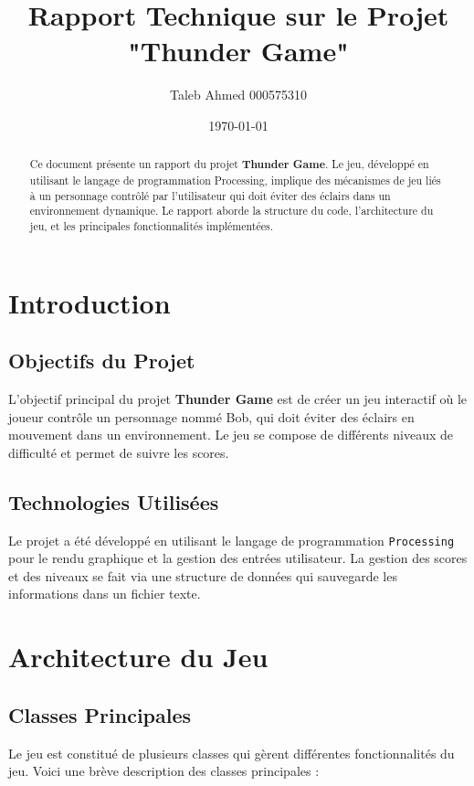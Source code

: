 \documentclass[a4paper,12pt]{article}
\title{Rapport Technique sur le Projet "Thunder Game"}
\author{Taleb Ahmed 000575310}
\date{\today}
\begin{document}
	
	\maketitle
	
	\begin{abstract}
		Ce document présente un rapport du projet \textbf{Thunder Game}. Le jeu, développé en utilisant le langage de programmation Processing, implique des mécanismes de jeu liés à un personnage contrôlé par l'utilisateur qui doit éviter des éclairs dans un environnement dynamique. Le rapport aborde la structure du code, l'architecture du jeu, et les principales fonctionnalités implémentées.
	\end{abstract}
	
	\newpage
	\tableofcontents
	\newpage
	
	\section{Introduction}
	
	\subsection{Objectifs du Projet}
	\noindent L'objectif principal du projet \textbf{Thunder Game} est de créer un jeu interactif où le joueur contrôle un personnage nommé Bob, qui doit éviter des éclairs en mouvement dans un environnement. Le jeu se compose de différents niveaux de difficulté et permet de suivre les scores.
	
	\subsection{Technologies Utilisées}
	\noindent Le projet a été développé en utilisant le langage de programmation \texttt{Processing} pour le rendu graphique et la gestion des entrées utilisateur. La gestion des scores et des niveaux se fait via une structure de données qui sauvegarde les informations dans un fichier texte.
	
	\newpage
	\section{Architecture du Jeu}
	
	\subsection{Classes Principales}
	\noindent Le jeu est constitué de plusieurs classes qui gèrent différentes fonctionnalités du jeu. Voici une brève description des classes principales :
	
\end{document}
